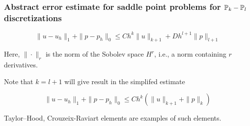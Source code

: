 \begin{frame}
\frametitle{Abstract error estimate for saddle point problems for $\mathbb{P}_k-\mathbb{P}_l$ discretizations}

\[
\| u - u_h \|_1 +  \| p - p_h \|_0 \leqslant C h^k \| u  \|_{k+1} +  D h^{l+1} \| p \|_{l+1}
\]


Here, $\|\cdot\|_r$ is the norm of the Sobolev space $H^r$, i.e., a
norm containing $r$ derivatives. 


Note that $k=l+1$ will give result in the simplifed estimate  

\[
\| u - u_h \|_1 +  \| p - p_h \|_0 \leqslant C h^k (\| u  \|_{k+1} + \| p \|_{k})
\]

Taylor--Hood, Crouzeix-Raviart elements are examples of such elements. 


\end{frame}

